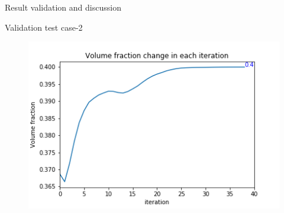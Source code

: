\documentclass[a4paper,12pt,times]{article}
\begin{document}
\begin{section}{Result validation and discussion}
\begin{subsection}{Validation test case-2}
\begin{figure}[H]
\begin{minipage}{.5\textwidth}
		\label{VC-03.5}
	\end{minipage}%
	\begin{minipage}{.5\textwidth}
		\centering
		\includegraphics[width=1\linewidth]{MMA_02_Volume_fractionVSiteration.png}
		\label{VC-03.6}
	\end{minipage}
\end{figure} 


\end{subsection}
\end{section}
\end{document}
